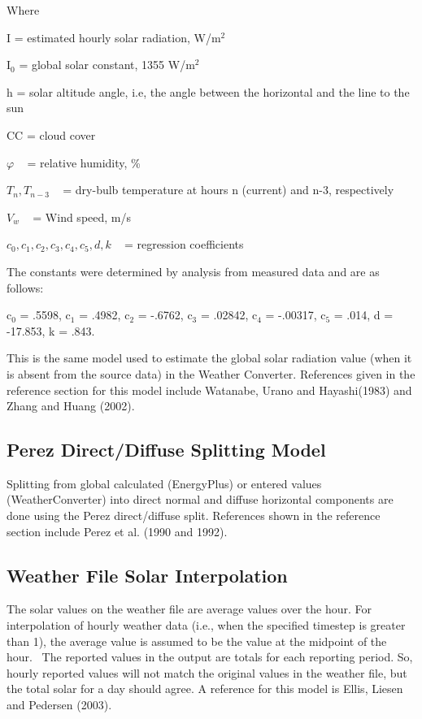 Where

I = estimated hourly solar radiation, W/m\(^{2}\)

I\(_{0}\) = global solar constant, 1355 W/m\(^{2}\)

h = solar altitude angle, i.e, the angle between the horizontal and the line to the sun

CC = cloud cover

\(\varphi\) ~ = relative humidity, \%

\({T_n},{T_{n - 3}}\) ~ = dry-bulb temperature at hours n (current) and n-3, respectively

\({V_w}\) ~ = Wind speed, m/s

\({c_0},{c_1},{c_2},{c_3},{c_4},{c_5},d,k\) ~ = regression coefficients

The constants were determined by analysis from measured data and are as follows:

c\(_{0}\) = .5598, c\(_{1}\) = .4982, c\(_{2}\) = -.6762, c\(_{3}\) = .02842, c\(_{4}\) = -.00317, c\(_{5}\) = .014, d = -17.853, k = .843.

This is the same model used to estimate the global solar radiation value (when it is absent from the source data) in the Weather Converter. References given in the reference section for this model include Watanabe, Urano and Hayashi(1983) and Zhang and Huang (2002).

\subsection{Perez Direct/Diffuse Splitting Model}\label{perez-directdiffuse-splitting-model}

Splitting from global calculated (EnergyPlus) or entered values (WeatherConverter) into direct normal and diffuse horizontal components are done using the Perez direct/diffuse split. References shown in the reference section include Perez et al. (1990 and 1992).

\subsection{Weather File Solar Interpolation}\label{weather-file-solar-interpolation}

The solar values on the weather file are average values over the hour. For interpolation of hourly weather data (i.e., when the specified timestep is greater than 1), the average value is assumed to be the value at the midpoint of the hour.~ The reported values in the output are totals for each reporting period. So, hourly reported values will not match the original values in the weather file, but the total solar for a day should agree. A reference for this model is Ellis, Liesen and Pedersen (2003).


